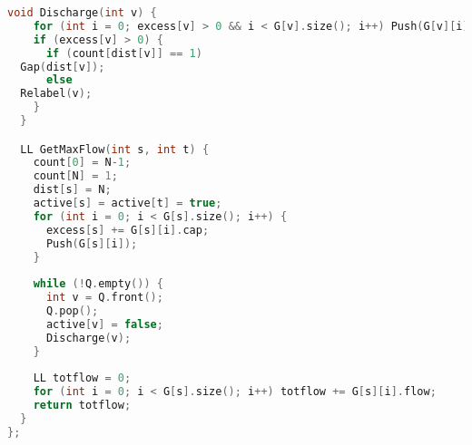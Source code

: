 \begin{lstlisting}[language=C++]
  void Discharge(int v) {
    for (int i = 0; excess[v] > 0 && i < G[v].size(); i++) Push(G[v][i]);
    if (excess[v] > 0) {
      if (count[dist[v]] == 1) 
  Gap(dist[v]); 
      else
  Relabel(v);
    }
  }

  LL GetMaxFlow(int s, int t) {
    count[0] = N-1;
    count[N] = 1;
    dist[s] = N;
    active[s] = active[t] = true;
    for (int i = 0; i < G[s].size(); i++) {
      excess[s] += G[s][i].cap;
      Push(G[s][i]);
    }
    
    while (!Q.empty()) {
      int v = Q.front();
      Q.pop();
      active[v] = false;
      Discharge(v);
    }
    
    LL totflow = 0;
    for (int i = 0; i < G[s].size(); i++) totflow += G[s][i].flow;
    return totflow;
  }
};

\end{lstlisting}
